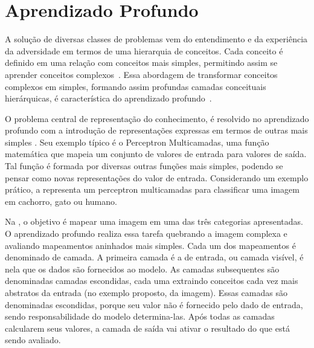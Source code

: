 
\section{Aprendizado Profundo} 

A solução de diversas classes de problemas vem do entendimento e da experiência da adversidade em termos de uma hierarquia de conceitos. Cada conceito é definido em uma relação com conceitos mais simples, permitindo assim se aprender conceitos complexos~\cite{redesneurais}. Essa abordagem de transformar conceitos complexos em simples, formando assim profundas camadas conceituais hierárquicas, é característica do aprendizado profundo~\cite{deep_learning}. 

O problema central de representação do conhecimento, é resolvido no aprendizado profundo com a introdução de representações expressas em termos de outras mais simples \cite{redesneurais}. Seu exemplo típico é o Perceptron Multicamadas, uma função matemática que mapeia um conjunto de valores de entrada para valores de saída. Tal função é formada por diversas outras funções mais simples, podendo se pensar como novas representações do valor de entrada. Considerando um exemplo prático, a  representa um perceptron multicamadas para classificar uma imagem em cachorro, gato ou humano. 

%

Na , o objetivo é mapear uma imagem em uma das três categorias apresentadas. O aprendizado profundo realiza essa tarefa quebrando a imagem complexa e avaliando mapeamentos aninhados mais simples. Cada um dos mapeamentos é denominado de camada. A primeira camada é a de entrada, ou camada visível, é nela que os dados são fornecidos ao modelo. As camadas subsequentes são denominadas camadas escondidas, cada uma extraindo conceitos cada vez mais abstratos da entrada (no exemplo proposto, da imagem). Essas camadas são denominadas escondidas, porque seu valor não é fornecido pelo dado de entrada, sendo responsabilidade do modelo determina-las. Após todas as camadas calcularem seus valores, a camada de saída vai ativar o resultado do que está sendo avaliado. 

